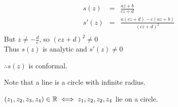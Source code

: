 \documentclass[letterpaper,12pt,fleqn]{article}
\begin{document}
\begin{theproof}
  \listbreak
  \begin{eqnarray*}
    s(z) &=& \frac{az+b}{cz+d} \\
    s'(z) &=& \frac{a(cz+d)-c(az+b)}{(cz+d)^2} \\
  \end{eqnarray*}
  But $z\ne-\frac{d}{c}$, so $(cz+d)^2\ne0$ \\
  Thus $s(z)$ is analytic and $s'(z)\ne0$
  
  $\therefore s(z)$ is conformal.
\end{theproof}

Note that a line is a circle with infinite radius.

\begin{theorem}
  $(z_1,z_2,z_3,z_4)\in\mathbb{R}\iff z_1,z_2,z_2,z_4$ lie on a circle.
\end{theorem}
\end{document}
